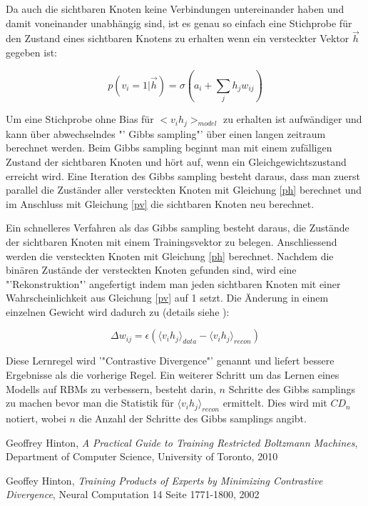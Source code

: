 \documentclass[12pt]{article}
\begin{document}
Da auch die sichtbaren Knoten keine Verbindungen untereinander haben und damit voneinander unabhängig sind, ist es genau so einfach eine Stichprobe für den Zustand eines sichtbaren Knotens zu erhalten wenn ein versteckter Vektor $\vec{h}$ gegeben ist:

\begin{equation}
p(v_i =1 | \vec{h}) = \sigma (a_i + \sum_{j} h_j w_{ij})
\label{pv}
\end{equation}

Um eine Stichprobe ohne Bias für $<v_i h_j>_{model}$ zu erhalten ist aufwändiger und kann über abwechselndes "' Gibbs sampling"' über einen langen zeitraum berechnet werden. Beim Gibbs sampling beginnt man mit einem zufälligen Zustand der sichtbaren Knoten und hört auf, wenn ein Gleichgewichtszustand erreicht wird. Eine Iteration des Gibbs sampling besteht daraus, dass man zuerst parallel die Zuständer aller versteckten Knoten mit Gleichung \ref{ph} berechnet und im Anschluss mit Gleichung \ref{pv} die sichtbaren Knoten neu berechnet.

Ein schnelleres Verfahren als das Gibbs sampling besteht daraus, die Zustände der sichtbaren Knoten mit einem Trainingsvektor zu belegen. Anschliessend werden die versteckten Knoten mit Gleichung \ref{ph} berechnet. Nachdem die binären Zustände der versteckten Knoten gefunden sind, wird eine "'Rekonstruktion"' angefertigt indem man jeden sichtbaren Knoten mit einer Wahrscheinlichkeit aus Gleichung \ref{pv} auf 1 setzt. Die Änderung in einem einzelnen Gewicht wird dadurch zu (details siehe \cite{digits}):

\begin{equation}
\Delta w_{ij} = \epsilon \left( \langle v_i h_j\rangle_{data} - \langle v_i h_j \rangle_{recon}\right)
\end{equation}

Diese Lernregel wird '"Contrastive Divergence"' genannt und liefert bessere Ergebnisse als die vorherige Regel. Ein weiterer Schritt um das Lernen eines Modells auf RBMs zu verbessern, besteht darin, $n$ Schritte des Gibbs samplings zu machen bevor man die Statistik für $\langle v_i h_j \rangle_{recon}$ ermittelt. Dies wird mit $CD_n$ notiert, wobei $n$ die Anzahl der Schritte des Gibbs samplings angibt.


\begin{thebibliography}{9}

Geoffrey Hinton,
\emph{A Practical Guide to Training Restricted Boltzmann Machines},
Department of Computer Science, 
University of Toronto,
2010

Geoffey Hinton,
\emph{Training Products of Experts by Minimizing Contrastive Divergence},
Neural Computation 14 Seite 1771-1800,
2002
\end{thebibliography}
\end{document}
